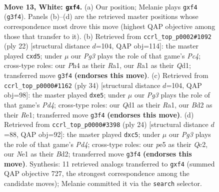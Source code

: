 \documentclass[11pt]{article}
\begin{document}
\begin{figure}[p]
\label{fig:thought-m22}
\end{figure}

\clearpage

\begin{figure}[p]\centering
\begin{subfigure}{0.46\textwidth}\centering
\resizebox{\linewidth}{!}{%
\newchessgame
\chessboard[
  setfen={r1bqkb1r/1pp5/1nn3p1/4p2p/p4p1P/2NP2P1/PP1BPPB1/R2QNR1K w kq - 0 13},
  showmover=false,
  pgfstyle=straightmove, color=movearrow, markmove={g3-f4}
]}
\caption{}
\end{subfigure}\hfill
\begin{subfigure}{0.46\textwidth}\centering
\resizebox{\linewidth}{!}{%
\newchessgame
\chessboard[
  setfen={r1bqr1k1/pp3pbp/n1p2np1/3p4/2PNP3/2N1BP2/PP2B1PP/R2QR1K1 w - - 0 12},
  showmover=false,
  pgfstyle=straightmove, color=movearrow, markmove={c4-d5}
]}
\caption{}
\end{subfigure}
\\[4pt]
\begin{subfigure}{0.46\textwidth}\centering
\resizebox{\linewidth}{!}{%
\newchessgame
\chessboard[
  setfen={r1bqr1k1/bp3pp1/p5np/3pp3/PP1P1n2/2P2N1P/1BQN1PP1/R3RBK1 w - - 0 18},
  showmover=false,
  pgfstyle=straightmove, color=movearrow, markmove={d4-e5}
]}
\caption{}
\end{subfigure}\hfill
\begin{subfigure}{0.46\textwidth}\centering
\resizebox{\linewidth}{!}{%
\newchessgame
\chessboard[
  setfen={r1bqr1k1/1p3ppp/n2b1n2/p1pp4/3P4/P1NBPP2/1PQBN1PP/R4RK1 w - - 0 13},
  showmover=false,
  pgfstyle=straightmove, color=movearrow, markmove={d4-c5}
]}
\caption{}
\end{subfigure}
\caption{\textbf{Move 13, White: \texttt{gxf4}.} (a) Our position; Melanie plays \texttt{gxf4} (\texttt{g3f4}). Panels (b)--(d) are the retrieved master positions whose correspondence most drove this move (highest QAP objective among those that transfer to it). (b) Retrieved from \texttt{ccrl\_top\_p0002\#1092} (ply 22) [structural distance $d$=104, QAP obj=114]: the master played \texttt{cxd5}; under $\mu$ our \emph{Pg3} plays the role of that game's \emph{Pc4}; cross-type roles: our \emph{P}h4 as their \emph{R}a1, our \emph{R}a1 as their \emph{Q}d1; transferred move \texttt{g3f4} \textbf{(endorses this move)}. (c) Retrieved from \texttt{ccrl\_top\_p0000\#1162} (ply 34) [structural distance $d$=104, QAP obj=98]: the master played \texttt{dxe5}; under $\mu$ our \emph{Pg3} plays the role of that game's \emph{Pd4}; cross-type roles: our \emph{Q}d1 as their \emph{R}a1, our \emph{B}d2 as their \emph{R}e1; transferred move \texttt{g3f4} \textbf{(endorses this move)}. (d) Retrieved from \texttt{ccrl\_top\_p0000\#3398} (ply 24) [structural distance $d$=88, QAP obj=92]: the master played \texttt{dxc5}; under $\mu$ our \emph{Pg3} plays the role of that game's \emph{Pd4}; cross-type roles: our \emph{p}e5 as their \emph{Q}c2, our \emph{N}e1 as their \emph{B}d2; transferred move \texttt{g3f4} \textbf{(endorses this move)}. Synthesis: 11 retrieved analogs transferred to \texttt{gxf4} (summed QAP objective 727, the strongest correspondence among the candidate moves); Melanie committed it via the \texttt{search} selector.}

\end{figure}
\end{document}
